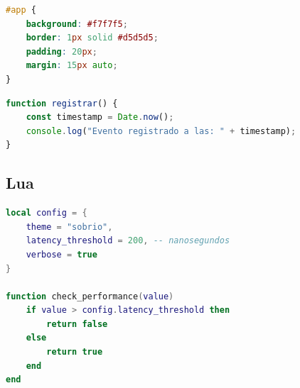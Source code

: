 \documentclass[11pt, a4paper]{article}
\begin{document}
\begin{lstlisting}[language=CSS, caption={Estilo formal del bloque principal en CSS.}]
#app {
    background: #f7f7f5;
    border: 1px solid #d5d5d5;
    padding: 20px;
    margin: 15px auto;
}
\end{lstlisting}

\begin{lstlisting}[language=JavaScript, caption={Función de registro en JavaScript.}]
function registrar() {
    const timestamp = Date.now();
    console.log("Evento registrado a las: " + timestamp);
}
\end{lstlisting}

\subsection{Lua}
\begin{lstlisting}[language=Lua, caption={Script de configuracion para cargadores rápidos en Lua.}]
local config = {
    theme = "sobrio",
    latency_threshold = 200, -- nanosegundos
    verbose = true
}

function check_performance(value)
    if value > config.latency_threshold then
        return false
    else
        return true
    end
end
\end{lstlisting}
\end{document}
